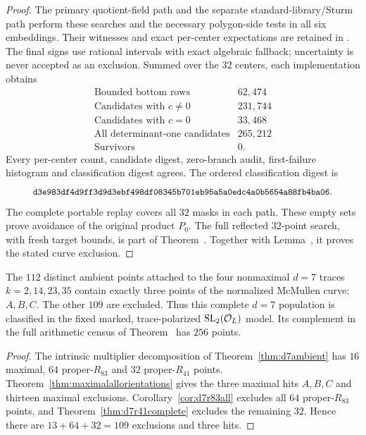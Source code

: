 \begin{proof}
The primary quotient-field path
 and the separate standard-library/Sturm
path  perform these searches
and the necessary polygon-side tests in all six embeddings.
Their witnesses and exact per-center expectations are retained in
.
The final signs use rational intervals with exact algebraic fallback;
uncertainty is never accepted as an exclusion.  Summed over the
$32$ centers, each implementation obtains
\[
\begin{array}{l|r}
\text{Bounded bottom rows}&62{,}474\\
\text{Candidates with }c\ne0&231{,}744\\
\text{Candidates with }c=0&33{,}468\\
\text{All determinant-one candidates}&265{,}212\\
\text{Survivors}&0.
\end{array}
\]
Every per-center count, candidate digest, zero-branch audit,
first-failure histogram and classification digest agrees.
The ordered classification digest is
\[
 \digest{d3e983df4d9ff3d9d3ebf498df08345b7}{01eb95a5a0edc4a0b5654a88fb4ba06}.
\]
The complete portable replay covers all $32$ masks in each path.
These empty sets prove avoidance of the original product $P_0$.
The full reflected $32$-point search, with fresh target bounds, is part
of Theorem~. Together with
Lemma~, it proves the stated curve exclusion.
\end{proof}

\begin{corollary}[Closure of the nonmaximal $d=7$ geometric packet]
\label{cor:d7geometrycomplete}
The $112$ distinct ambient points attached to the four nonmaximal
$d=7$ traces $k=2,14,23,35$ contain exactly three points of the
normalized McMullen curve: $A,B,C$.  The other $109$ are excluded.
Thus this complete $d=7$ population is classified in the fixed marked,
trace-polarized $\operatorname{SL}_2(\mathcal O_L)$ model.  Its complement in the full arithmetic census of
Theorem~ has $256$ points.
\end{corollary}
\begin{proof}
The intrinsic multiplier decomposition of
Theorem~\ref{thm:d7ambient} has $16$ maximal, $64$ proper-$R_{83}$
and $32$ proper-$R_{41}$ points.
Theorem~\ref{thm:maximalallorientations} gives the three maximal
hits $A,B,C$ and thirteen maximal exclusions.
Corollary~\ref{cor:d7r83all} excludes all $64$ proper-$R_{83}$
points, and Theorem~\ref{thm:d7r41complete} excludes the remaining
$32$.  Hence there are $13+64+32=109$ exclusions and three hits.
\end{proof}

